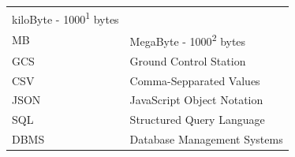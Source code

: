 \documentclass[12pt,oneside]{reedthesis}
\theoremstyle{definition}
\theoremstyle{definition}
\theoremstyle{definition}
\theoremstyle{remark}
\begin{document}
\begin{abbrvs}
\begin{longtable}[]{@{}ll@{}}
\begin{minipage}[t]{0.41\columnwidth}
    kiloByte - 1000\textsuperscript{1} bytes\strut
    \end{minipage}\tabularnewline
    \begin{minipage}[t]{0.26\columnwidth}\raggedright\strut
    MB\strut
    \end{minipage} & \begin{minipage}[t]{0.41\columnwidth}\raggedright\strut
    MegaByte - 1000\textsuperscript{2} bytes\strut
    \end{minipage}\tabularnewline
    \begin{minipage}[t]{0.26\columnwidth}\raggedright\strut
    GCS\strut
    \end{minipage} & \begin{minipage}[t]{0.41\columnwidth}\raggedright\strut
    Ground Control Station\strut
    \end{minipage}\tabularnewline
    \begin{minipage}[t]{0.26\columnwidth}\raggedright\strut
    CSV\strut
    \end{minipage} & \begin{minipage}[t]{0.41\columnwidth}\raggedright\strut
    Comma-Sepparated Values\strut
    \end{minipage}\tabularnewline
    \begin{minipage}[t]{0.26\columnwidth}\raggedright\strut
    JSON\strut
    \end{minipage} & \begin{minipage}[t]{0.41\columnwidth}\raggedright\strut
    JavaScript Object Notation\strut
    \end{minipage}\tabularnewline
    \begin{minipage}[t]{0.26\columnwidth}\raggedright\strut
    SQL\strut
    \end{minipage} & \begin{minipage}[t]{0.41\columnwidth}\raggedright\strut
    Structured Query Language\strut
    \end{minipage}\tabularnewline
    \begin{minipage}[t]{0.26\columnwidth}\raggedright\strut
    DBMS\strut
    \end{minipage} & \begin{minipage}[t]{0.41\columnwidth}\raggedright\strut
    Database Management Systems\strut
    \end{minipage}\tabularnewline
    \bottomrule
    \end{longtable}
  \end{abbrvs}
  \hypersetup{linkcolor=black}
  \setcounter{tocdepth}{2}
  \tableofcontents
\end{document}
